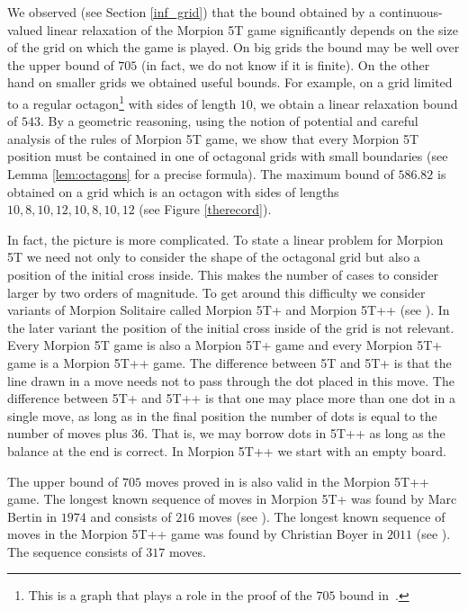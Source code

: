 We observed (see Section \ref{inf_grid}) that the bound obtained by a continuous-valued linear relaxation of the Morpion 5T game significantly depends on the size of the grid on which the game is played. On big grids the bound may be well over the upper bound of $705$ (in fact, we do not know if it is finite). On the other hand on smaller grids we obtained useful bounds. For example, on a grid limited to a regular octagon\footnote{This is a graph that plays a role in the proof of the $705$ bound in~\cite{demaine}.} with sides of length $10$, we obtain a linear relaxation bound of $543$.
By a geometric reasoning, using the notion of potential and careful analysis of the rules of Morpion 5T game, we show that every Morpion 5T position must be contained in one of \theoctagons octagonal grids with small boundaries (see Lemma \ref{lem:octagons} for a precise formula). The maximum bound of $586.82$ is obtained on a grid which is an octagon with sides of lengths $10,8,10,12,10,8,10,12$ (see Figure \ref{therecord}).

In fact, the picture is more complicated. To state a linear problem for Morpion 5T we need not only to consider the shape of the octagonal grid but also a position of the initial cross inside. This makes the number of cases to consider larger by two orders of magnitude. To get around this difficulty we consider variants of Morpion Solitaire called Morpion 5T+ and Morpion 5T++ (see \cite{boyer}). In the later variant the position of the initial cross inside of the grid is not relevant.
Every Morpion 5T game is also a Morpion 5T+ game and every Morpion 5T+ game is a Morpion 5T++ game.
The difference between 5T and 5T+ is that the line drawn in a move needs not to pass through the dot placed in this move.
The difference between 5T+ and 5T++ is that one may place more than one dot in a single move, as long as in the final position the number of dots is equal to the number of moves plus $36$. That is, we may borrow dots in 5T++ as long as the balance at the end is correct. In Morpion 5T++ we start with an empty board.

The upper bound of $705$ moves proved in \cite{demaine} is also valid in the Morpion 5T++ game. The longest known sequence of moves in Morpion 5T+ was found by Marc Bertin in $1974$ and consists of $216$ moves (see \cite{boyer}). The longest known sequence of moves in the Morpion 5T++ game was found by Christian Boyer in $2011$ (see \cite{boyer}). The sequence consists of $317$ moves. 

